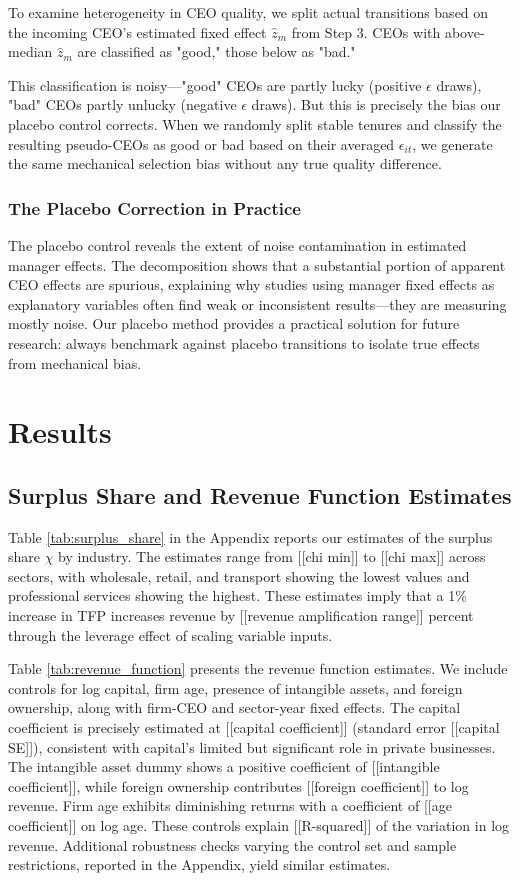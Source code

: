 \documentclass[11pt,a4paper]{article}
\begin{document}
To examine heterogeneity in CEO quality, we split actual transitions based on the incoming CEO's estimated fixed effect $\hat{z}_m$ from Step 3. CEOs with above-median $\hat{z}_m$ are classified as "good," those below as "bad."

This classification is noisy—"good" CEOs are partly lucky (positive $\epsilon$ draws), "bad" CEOs partly unlucky (negative $\epsilon$ draws). But this is precisely the bias our placebo control corrects. When we randomly split stable tenures and classify the resulting pseudo-CEOs as good or bad based on their averaged $\epsilon_{it}$, we generate the same mechanical selection bias without any true quality difference.

\subsubsection{The Placebo Correction in Practice}

The placebo control reveals the extent of noise contamination in estimated manager effects. The decomposition shows that a substantial portion of apparent CEO effects are spurious, explaining why studies using manager fixed effects as explanatory variables often find weak or inconsistent results—they are measuring mostly noise. Our placebo method provides a practical solution for future research: always benchmark against placebo transitions to isolate true effects from mechanical bias.

\section{Results}

\subsection{Surplus Share and Revenue Function Estimates}

Table \ref{tab:surplus_share} in the Appendix reports our estimates of the surplus share $\chi$ by industry. The estimates range from [[chi min]] to [[chi max]] across sectors, with wholesale, retail, and transport showing the lowest values and professional services showing the highest. These estimates imply that a 1\% increase in TFP increases revenue by [[revenue amplification range]] percent through the leverage effect of scaling variable inputs.

Table \ref{tab:revenue_function} presents the revenue function estimates. We include controls for log capital, firm age, presence of intangible assets, and foreign ownership, along with firm-CEO and sector-year fixed effects. The capital coefficient is precisely estimated at [[capital coefficient]] (standard error [[capital SE]]), consistent with capital's limited but significant role in private businesses. The intangible asset dummy shows a positive coefficient of [[intangible coefficient]], while foreign ownership contributes [[foreign coefficient]] to log revenue. Firm age exhibits diminishing returns with a coefficient of [[age coefficient]] on log age. These controls explain [[R-squared]] of the variation in log revenue. Additional robustness checks varying the control set and sample restrictions, reported in the Appendix, yield similar estimates.
\end{document}

